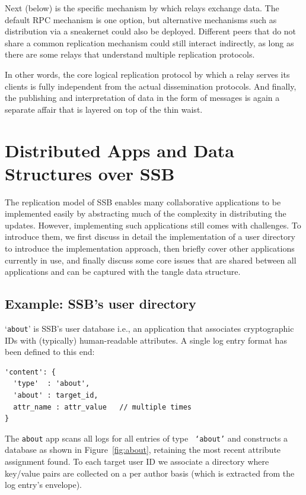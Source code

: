 \documentclass[10pt,sigconf,rewiew]{acmart}
\begin{document}
Next (below) is the specific mechanism by which relays exchange data. The default RPC mechanism is one option, but alternative mechanisms such as distribution via a sneakernet could also be deployed. Different peers that do not share a common replication mechanism could still interact indirectly, as long as there are some relays that understand multiple replication protocols.

In other words, the core logical replication protocol by which a relay serves its clients is fully independent from the actual dissemination protocols. And finally, the publishing and interpretation of data in the form of messages is again a separate affair that is layered on top of the thin waist.

\section{Distributed Apps and Data Structures over SSB}
\label{sect:apps}

The replication model of SSB enables many collaborative applications to be implemented easily by abstracting much of the complexity in distributing the updates. However, implementing such applications still comes with challenges. To introduce them, we first discuss in detail the implementation of a user directory to introduce the implementation approach, then briefly cover other applications currently in use, and finally discuss some core issues that are shared between all applications and can be captured with the tangle data structure.

\subsection{Example: SSB's user directory}
\label{ssect:about}

`{\small\tt about}' is SSB's user database i.e., an application that
associates cryptographic IDs with (typically) human-readable
attributes. A single log entry format has been defined to this end:
{\small\begin{verbatim}
'content': {
  'type'  : 'about',
  'about' : target_id,
  attr_name : attr_value   // multiple times
}
\end{verbatim}}

\noindent
The {\small\tt about} app scans all logs for all entries of type {\small\tt
  `about'} and constructs a database as shown in
Figure~\ref{fig:about}, retaining the most recent attribute assignment
found.  To each target user ID we associate a directory where
key/value pairs are collected on a per author basis (which is extracted
from the log entry's envelope).
\end{document}
